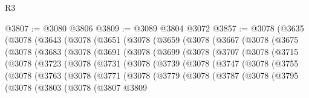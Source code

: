 \begin{lexlean}{R3}
\begin{coremodule}
@3807 := @3080 @3806
@3809 := @3089 @3804 @3072
@3857 := @3078
    (@3635
      (@3078
        (@3643
          (@3078
            (@3651
              (@3078
                (@3659
                  (@3078
                    (@3667
                      (@3078
                        (@3675
                          (@3078
                            (@3683
                              (@3078
                                (@3691
                                  (@3078
                                    (@3699
                                      (@3078
                                        (@3707
                                          (@3078
                                            (@3715
                                              (@3078
                                                (@3723
                                                  (@3078
                                                    (@3731
                                                      (@3078
                                                        (@3739
                                                          (@3078
                                                            (@3747
                                                              (@3078
                                                                (@3755
                                                                  (@3078
                                                                    (@3763
                                                                      (@3078
                                                                        (@3771
                                                                          (@3078
                                                                            (@3779
                                                                              (@3078
                                                                                (@3787
                                                                                  (@3078
                                                                                    (@3795
                                                                                      (@3078
                                                                                        (@3803
                                                                                          (@3078
                                                                                            (@3807
                                                                                              @3809

\end{coremodule}
\end{lexlean}
